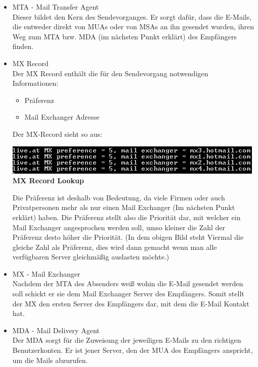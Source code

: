 \documentclass[12pt,a4paper]{report}
\begin{document}
\begin{onehalfspace}
\begin{itemize}
\begin{itemize}
\end{itemize}
\item MTA - Mail Transfer Agent\\\label{itm:MTA}
Dieser bildet den Kern des Sendevorganges. Er sorgt dafür, dass die E-Mails, die entweder direkt von MUAs oder von MSAs an ihn gesendet wurden, ihren Weg zum MTA bzw. MDA (im nächsten Punkt erklärt) des Empfängers finden.
\item MX Record\\\label{itm:MX Record}
Der MX Record enthält die für den Sendevorgang notwendigen Informationen:
\begin{itemize}
\item Präferenz
\item Mail Exchanger Adresse
\end{itemize}
Der MX-Record sieht so aus:
\begin{center}
\includegraphics[scale=1]{../docs/lyaton/graphics/MX-Record.png}\\
\textbf{MX Record Lookup}
\end{center}
Die Präferenz ist deshalb von Bedeutung, da viele Firmen oder auch Privatpersonen mehr als nur einen Mail Exchanger (Im nächsten Punkt erklärt) haben. Die Präferenz stellt also die Priorität dar, mit welcher ein Mail Exchanger angesprochen werden soll, umso kleiner die Zahl der Präferenz desto höher die Priorität. (In dem obigen Bild steht Viermal die gleiche Zahl als Präferenz, dies wird dann gemacht wenn man alle verfügbaren Server gleichmäßig auslasten möchte.)
\item MX - Mail Exchanger\\\label{itm:MX}
Nachdem der MTA des Absenders weiß wohin die E-Mail gesendet werden soll schickt er sie dem Mail Exchanger Server des Empfängers. Somit stellt der MX den ersten Server des Empfängers dar, mit dem die E-Mail Kontakt hat. 
\item MDA - Mail Delivery Agent\\\label{itm:MDA}
Der MDA sorgt für die Zuweisung der jeweiligen E-Mails zu den richtigen Benutzerkonten. Er ist jener Server, den der MUA des Empfängers anspricht, um die Mails abzurufen.
\end{itemize}
\begin{center}

\end{center}
\end{onehalfspace}
\end{document}
